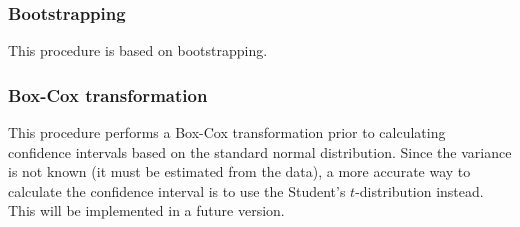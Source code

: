 \documentclass[12pt,a4paper]{article}
\begin{document}
\subsubsection{Bootstrapping}
This procedure is based on bootstrapping.

\subsubsection{Box-Cox transformation}
This procedure performs a Box-Cox transformation prior to calculating confidence intervals based on the standard normal distribution. Since the variance is not known (it must be estimated from the data), a more accurate way to calculate the confidence interval is to use the Student's $t$-distribution instead. This will be implemented in a future version.

        	
\end{document}
